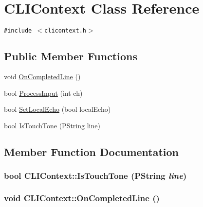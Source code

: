 \hypertarget{classCLIContext}{
\section{CLIContext Class Reference}
\label{classCLIContext}
}
{\tt \#include $<$clicontext.h$>$}

\subsection*{Public Member Functions}
\begin{CompactItemize}
\item 
void \hyperlink{classCLIContext_c0bea8c8adbe7262b6e9a786ab691ed7}{OnCompletedLine} ()
\item 
bool \hyperlink{classCLIContext_4d8a44a878b5e5ebf767c55b7f872f63}{ProcessInput} (int ch)
\item 
bool \hyperlink{classCLIContext_f38452b224b03da39d12158922a90d19}{SetLocalEcho} (bool localEcho)
\item 
bool \hyperlink{classCLIContext_624d161af4a077a23c06d4e88254a787}{IsTouchTone} (PString line)
\end{CompactItemize}


\subsection{Member Function Documentation}
\hypertarget{classCLIContext_624d161af4a077a23c06d4e88254a787}{
\subsubsection[{IsTouchTone}]{\setlength{\rightskip}{0pt plus 5cm}bool CLIContext::IsTouchTone (PString {\em line})}}
\label{classCLIContext_624d161af4a077a23c06d4e88254a787}


\hypertarget{classCLIContext_c0bea8c8adbe7262b6e9a786ab691ed7}{
\subsubsection[{OnCompletedLine}]{\setlength{\rightskip}{0pt plus 5cm}void CLIContext::OnCompletedLine ()}}
\label{classCLIContext_c0bea8c8adbe7262b6e9a786ab691ed7}


